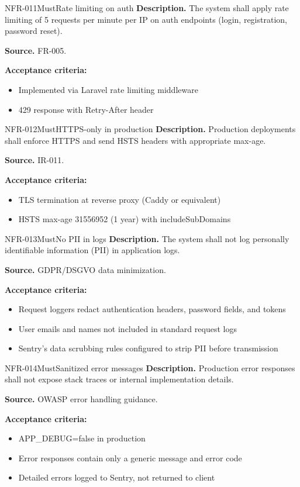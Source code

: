 \documentclass[11pt,a4paper]{article}
\begin{document}
\begin{requirement}{NFR-011}{Must}{Rate limiting on auth}
\textbf{Description.} The system shall apply rate limiting of 5 requests per minute per IP on auth endpoints (login, registration, password reset).

\textbf{Source.} FR-005.

\textbf{Acceptance criteria:}
\begin{itemize}
    \item Implemented via Laravel rate limiting middleware
    \item 429 response with Retry-After header
\end{itemize}
\end{requirement}

\begin{requirement}{NFR-012}{Must}{HTTPS-only in production}
\textbf{Description.} Production deployments shall enforce HTTPS and send HSTS headers with appropriate max-age.

\textbf{Source.} IR-011.

\textbf{Acceptance criteria:}
\begin{itemize}
    \item TLS termination at reverse proxy (Caddy or equivalent)
    \item HSTS max-age 31556952 (1 year) with includeSubDomains
\end{itemize}
\end{requirement}

\begin{requirement}{NFR-013}{Must}{No PII in logs}
\textbf{Description.} The system shall not log personally identifiable information (PII) in application logs.

\textbf{Source.} GDPR/DSGVO data minimization.

\textbf{Acceptance criteria:}
\begin{itemize}
    \item Request loggers redact authentication headers, password fields, and tokens
    \item User emails and names not included in standard request logs
    \item Sentry's data scrubbing rules configured to strip PII before transmission
\end{itemize}
\end{requirement}

\begin{requirement}{NFR-014}{Must}{Sanitized error messages}
\textbf{Description.} Production error responses shall not expose stack traces or internal implementation details.

\textbf{Source.} OWASP error handling guidance.

\textbf{Acceptance criteria:}
\begin{itemize}
    \item APP\_DEBUG=false in production
    \item Error responses contain only a generic message and error code
    \item Detailed errors logged to Sentry, not returned to client
\end{itemize}
\end{requirement}
\end{document}
